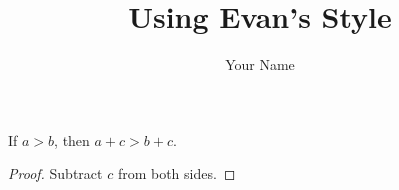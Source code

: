 \documentclass[11pt]{article}
\title{Using Evan’s Style}
\author{Your Name}
\begin{document}
\maketitle

\begin{theorem}
If \( a > b \), then \( a + c > b + c \).
\end{theorem}

\begin{proof}
Subtract \( c \) from both sides.
\end{proof}
\end{document}
